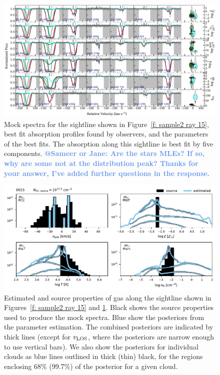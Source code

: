 \documentclass[fleqn,usenatbib]{mnras}
\makeatletter
\newcommand{\atsameer}[1]{\textcolor{CornflowerBlue}{\textbf{@Sameer or Jane: #1}}}
\makeatother
\begin{document}
\begin{figure}
    \centering
    \includegraphics[width=\textwidth]{figures/sample2/best_fits/0015.pdf}
    \caption{
    Mock spectra for the sightline shown in Figure~\ref{f: sample2 ray 15},
    best fit absorption profiles found by observers,
    and the parameters of the best fits.
    The absorption along this sightline is best fit by five components.
    \atsameer{Are the stars MLEs? If so, why are some not at the distribution peak? Thanks for your answer, I've added further questions in the response.}
    }
    \label{f: sample2 spectrum 15}
    \end{figure}

\begin{figure}
    \centering
    \includegraphics[width=\textwidth]{figures/sample2/high-z/sightline_0015.pdf}
    \caption{
    Estimated and source properties of gas along the sightline shown in Figures~\ref{f: sample2 ray 15} and \ref{f: sample2 spectrum 15}.
    Black shows the source properties used to produce the mock spectra.
    Blue show the posteriors from the parameter estimation. 
    The combined posteriors are indicated by thick lines (except for $v_{\rm LOS}$, where the posteriors are narrow enough to use vertical bars).
    We also show the posteriors for individual clouds as blue lines outlined in thick (thin) black, for the regions enclosing 68\% (99.7\%) of the posterior for a given cloud.
    }
    \label{f: sample2 15}
\end{figure}
\end{document}
